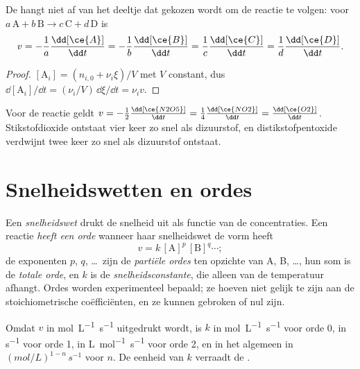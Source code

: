 \begin{proposition}\label{prop:b1:rate-laws:rate-relations}
De  hangt niet af van het deeltje dat gekozen wordt om de
reactie te volgen: voor
$a\,\mathrm{A} + b\,\mathrm{B} \longrightarrow c\,\mathrm{C} + d\,\mathrm{D}$
is
\[
  v = -\frac1a\frac{\dd[\ce{A}]}{\dd t} = -\frac1b\frac{\dd[\ce{B}]}{\dd t}
  = \frac1c\frac{\dd[\ce{C}]}{\dd t} = \frac1d\frac{\dd[\ce{D}]}{\dd t} .
\]
\end{proposition}


\begin{proof}
$[\mathrm{A}_i] = (n_{i,0} + \nu_i\xi)/V$ met $V$ constant, dus
$\dd[\mathrm{A}_i]/\dd t = (\nu_i/V)\,\dd\xi/\dd t = \nu_i v$.
\end{proof}

\begin{example}\label{ex:b1:rate-laws:n2o5}
Voor de reactie  geldt $v = -\frac12\frac{\dd[\ce{N2O5}]}{\dd t} =
\frac14\frac{\dd[\ce{NO2}]}{\dd t} = \frac{\dd[\ce{O2}]}{\dd t}$.
Stikstofdioxide ontstaat vier keer zo snel als dizuurstof, en
distikstofpentoxide verdwijnt twee keer zo snel als dizuurstof ontstaat.
\end{example}

\section{Snelheidswetten en ordes}

\begin{definition}\label{def:b1:rate-laws:order}
Een \emph{snelheidswet} drukt de snelheid uit als
functie van de concentraties. Een reactie \emph{heeft een orde} wanneer
haar snelheidswet de vorm heeft
\[
  v = k\,[\mathrm{A}]^{p}\,[\mathrm{B}]^{q} \cdots ;
\]
de exponenten $p$, $q$, \dots\ zijn de \emph{partiële ordes}
ten opzichte van A, B, \dots, hun som is de \emph{totale
orde}, en $k$ is de \emph{snelheidsconstante},
die alleen van de temperatuur afhangt. Ordes worden experimenteel
bepaald; ze hoeven niet gelijk te zijn aan de stoichiometrische
coëfficiënten, en ze kunnen gebroken of nul zijn.
\end{definition}

\begin{remark}\label{rem:b1:rate-laws:units}
Omdat $v$ in \unit{mol.L^{-1}.s^{-1}} uitgedrukt wordt, is $k$ in
\unit{mol.L^{-1}.s^{-1}} voor orde 0, in \unit{s^{-1}} voor orde 1, in
\unit{L.mol^{-1}.s^{-1}} voor orde 2, en in het algemeen in
$(\unit{mol/L})^{1-n}\,\unit{s^{-1}}$ voor  $n$. De eenheid
van $k$ verraadt de .
\end{remark}


